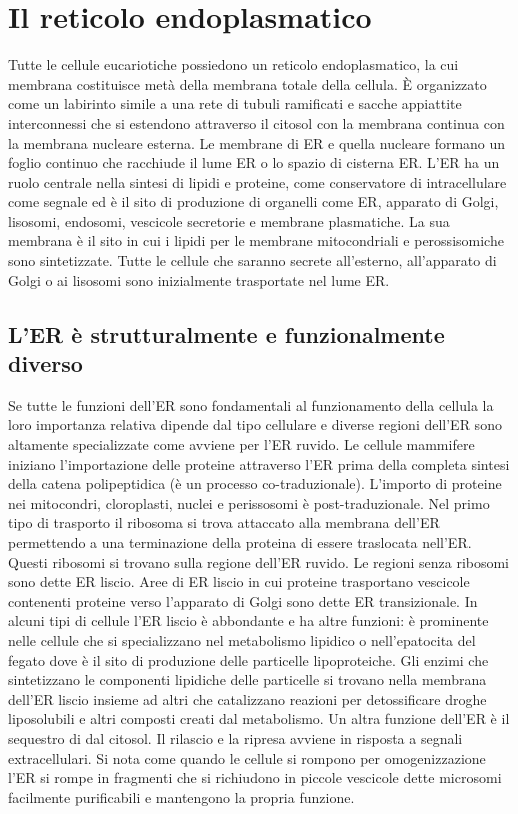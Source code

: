 \section{Il reticolo endoplasmatico}
Tutte le cellule eucariotiche possiedono un reticolo endoplasmatico, la cui membrana costituisce met\`a della membrana totale della cellula. \`E organizzato come un labirinto simile a 
una rete di tubuli ramificati e sacche appiattite interconnessi che si estendono attraverso il citosol con la membrana continua con la membrana nucleare esterna. Le membrane di ER e 
quella nucleare formano un foglio continuo che racchiude il lume ER o lo spazio di cisterna ER. L'ER ha un ruolo centrale nella sintesi di lipidi e proteine, come conservatore di
 intracellulare come segnale ed \`e il sito di produzione di organelli come ER, apparato di Golgi, lisosomi, endosomi, vescicole secretorie e membrane plasmatiche. 
La sua membrana \`e il sito in cui i lipidi per le membrane mitocondriali e perossisomiche sono sintetizzate. Tutte le cellule che saranno secrete all'esterno, all'apparato di Golgi o ai
lisosomi sono inizialmente trasportate nel lume ER.
\subsection{L'ER \`e strutturalmente e funzionalmente diverso}
Se tutte le funzioni dell'ER sono fondamentali al funzionamento della cellula la loro importanza relativa dipende dal tipo cellulare e diverse regioni dell'ER sono altamente 
specializzate come avviene per l'ER ruvido. Le cellule mammifere iniziano l'importazione delle proteine attraverso l'ER prima della completa sintesi della catena polipeptidica (\`e un
processo co-traduzionale). L'importo di proteine nei mitocondri, cloroplasti, nuclei e perissosomi \`e post-traduzionale. Nel primo tipo di trasporto il ribosoma si trova attaccato alla
membrana dell'ER permettendo a una terminazione della proteina di essere traslocata nell'ER. Questi ribosomi si trovano sulla regione dell'ER ruvido. Le regioni senza ribosomi sono 
dette ER liscio. Aree di ER liscio in cui proteine trasportano vescicole contenenti proteine verso l'apparato di Golgi sono dette ER transizionale. In alcuni tipi di cellule l'ER liscio
\`e abbondante e ha altre funzioni: \`e prominente nelle cellule che si specializzano nel metabolismo lipidico o nell'epatocita del fegato dove \`e il sito di produzione delle 
particelle lipoproteiche. Gli enzimi che sintetizzano le componenti lipidiche delle particelle si trovano nella membrana dell'ER liscio insieme ad altri che catalizzano reazioni per
detossificare droghe liposolubili e altri composti creati dal metabolismo. Un altra funzione dell'ER \`e il sequestro di  dal citosol. Il rilascio e la ripresa avviene in
risposta a segnali extracellulari. Si nota come quando le cellule si rompono per omogenizzazione l'ER si rompe in fragmenti che si richiudono in piccole vescicole dette microsomi 
facilmente purificabili e mantengono la propria funzione. 
